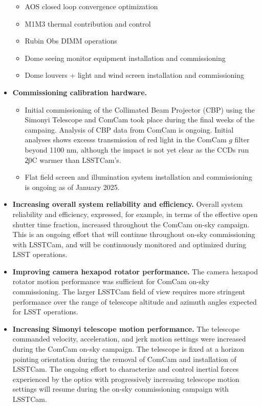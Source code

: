 \begin{itemize}
\begin{itemize}
        \item AOS closed loop convergence optimization
        \item M1M3 thermal contribution and control
        \item Rubin Obs DIMM operations
        \item Dome seeing monitor equipment installation and commissioning
        \item Dome louvers + light and wind screen installation and commissioning
    \end{itemize}
    \item \textbf{Commissioning calibration hardware.}
    \begin{itemize}
        \item Initial commissioning of the Collimated Beam Projector (CBP) using the Simonyi Telescope and
          ComCam took place during the final weeks of the campaing. Analysis of CBP data from ComCam is
          ongoing. Initial analyses shows excesss transmission of red light in the ComCam $g$ filter beyond
          1100 nm, although the impact is not yet clear as the \ComCam CCDs run \c 20C warmer than LSSTCam's.
        \item Flat field screen and illumination system installation and commissioning is ongoing as of January 2025.
    \end{itemize}
    \item \textbf{Increasing overall system reliability and efficiency.} Overall system reliability and efficiency, expressed, for example, in terms of the effective open shutter time fraction, increased throughout the ComCam on-sky campaign. This is an ongoing effort that will continue throughout on-sky commissioning with LSSTCam, and will be continuously monitored and optimized during LSST operations.
    \item \textbf{Improving camera hexapod rotator performance.} The camera hexapod rotator motion performance was sufficient for ComCam on-sky commissioning. The larger LSSTCam field of view requires more stringent performance over the range of telescope altitude and azimuth angles expected for LSST operations.
    \item \textbf{Increasing Simonyi telescope motion performance.} The telescope commanded velocity,
      acceleration, and jerk motion settings were increased during the ComCam on-sky campaign. The telescope is fixed at a horizon pointing orientation during the removal of ComCam and installation of LSSTCam. The ongoing effort to characterize and control inertial forces experienced by the optics with progressively increasing telescope motion settings will resume during the on-sky commissioning campaign with LSSTCam.
\end{itemize}
